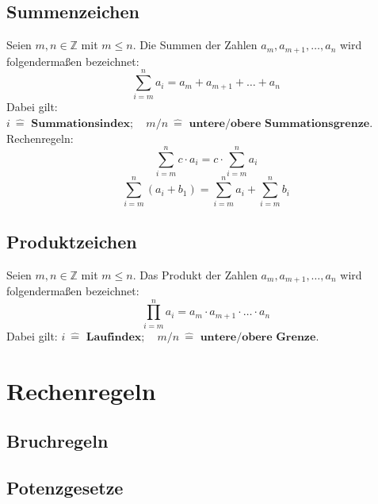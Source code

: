 \documentclass[12pt]{article}
\begin{document}
\subsection{Summenzeichen}
Seien $m, n \in \mathbb{Z}$ mit $m \leq n$. Die Summen der Zahlen $a_m, a_{m+1}, \dots, a_n$ wird folgendermaßen bezeichnet:
\[\sum_{i=m}^{n}a_i = a_m + a_{m+1} + \ldots + a_n\]
Dabei gilt: $i \: \widehat{=} \textbf{ Summationsindex}; \quad m/n \: \widehat{=} \textbf{ untere/obere Summationsgrenze}$.
Rechenregeln:
\[\sum_{i=m}^{n}c \cdot a_i = c \cdot \sum_{i=m}^{n}a_i\]
\[\sum_{i=m}^{n}(a_i + b_1) = \sum_{i=m}^{n}a_i + \sum_{i=m}^{n}b_i\]
\subsection{Produktzeichen}
Seien $m, n \in \mathbb{Z}$ mit $m \leq n$. Das Produkt der Zahlen $a_m, a_{m+1},\ldots, a_n$ wird folgendermaßen bezeichnet:
\[\prod_{i=m}^{n}a_i = a_m \cdot a_{m+1} \cdot \ldots \cdot a_n\]
Dabei gilt: $i \: \widehat{=} \textbf{ Laufindex}; \quad m/n \: \widehat{=} \textbf{ untere/obere Grenze}$.

\newpage
\section{Rechenregeln}
\subsection{Bruchregeln}
\begin{center}
\end{center}

\subsection{Potenzgesetze}
\begin{center}
\end{center}
\end{document}
